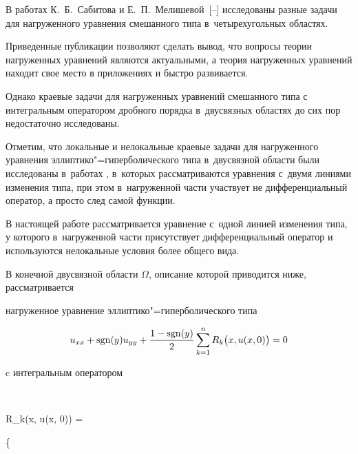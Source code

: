 В работах К.~Б.~Сабитова и Е.~П.~Мелишевой~[--] исследованы разные задачи для нагруженного уравнения смешанного типа в~четырехугольных областях. 

Приведенные  публикации  позволяют сделать вывод, что вопросы теории нагруженных уравнений являются актуальными, а теория нагруженных уравнений находит свое место в приложениях и быстро развивается.

Однако краевые задачи для нагруженных уравнений смешанного типа  с интегральным оператором дробного порядка в~двусвязных областях до сих пор недостаточно исследованы. 

Отметим, что локальные и нелокальные краевые задачи для нагруженного уравнения эллиптико"=гиперболического типа в~двусвязной области были исследованы в~работах \cite{Abdu:bib:Abdull, Abd:bib:Abdullaev}, в~которых рассматриваются уравнения с~двумя линиями  изменения типа, при этом в~нагруженной части участвует не дифференциальный оператор, а просто след самой функции.

В настоящей работе рассматривается уравнение с~одной линией изменения типа, у которого в~нагруженной части присутствует дифференциальный оператор и используются нелокальные условия более общего вида.





\smallskip





В  конечной двусвязной области $\Omega $, описание которой приводится ниже, рассматривается 


нагруженное уравнение эллиптико"=гиперболического типа

\begin{equation}

u_{xx} + \mathop{\rm sgn} (y)u_{yy} + \frac{{1 - \mathop{\rm sgn} (y)}}{2}\sum\limits_{k = 1}^n {R_k}\bigl(x, u(x, 0)\bigr)  = 0 \label{eq:1.1}

\end{equation}

c интегральным оператором

$$

{R_k}\bigl(x, u(x, 0)\bigr) = 

\left\{ 

